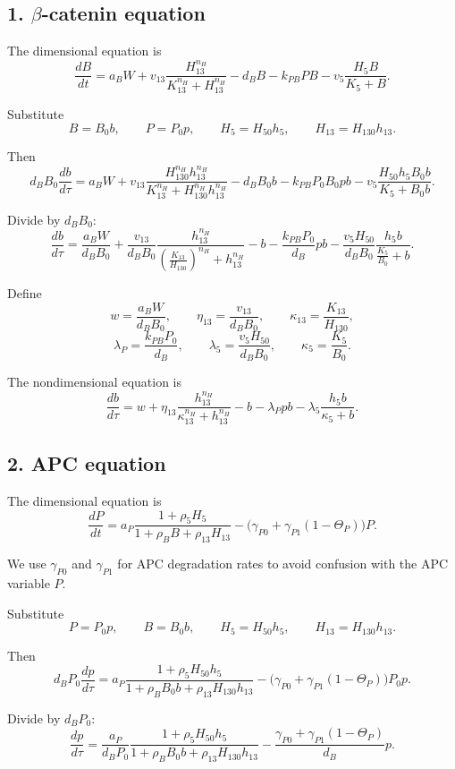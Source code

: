 \documentclass[11pt]{article}
\begin{document}
\subsection{1. \(\beta\)-catenin equation}

The dimensional equation is
\[
\frac{dB}{dt}
=
a_BW
+
v_{13}
\frac{H_{13}^{n_H}}
{K_{13}^{n_H}+H_{13}^{n_H}}
-
d_BB
-
k_{PB}PB
-
v_5\frac{H_5B}{K_5+B}.
\]

Substitute
\[
B=B_0b,\qquad P=P_0p,\qquad H_5=H_{50}h_5,\qquad H_{13}=H_{130}h_{13}.
\]

Then
\[
d_BB_0\frac{db}{d\tau}
=
a_BW
+
v_{13}
\frac{H_{130}^{n_H}h_{13}^{n_H}}
{K_{13}^{n_H}+H_{130}^{n_H}h_{13}^{n_H}}
-
d_BB_0b
-
k_{PB}P_0B_0pb
-
v_5
\frac{H_{50}h_5B_0b}{K_5+B_0b}.
\]

Divide by \(d_BB_0\):
\[
\frac{db}{d\tau}
=
\frac{a_BW}{d_BB_0}
+
\frac{v_{13}}{d_BB_0}
\frac{h_{13}^{n_H}}
{\left(\frac{K_{13}}{H_{130}}\right)^{n_H}+h_{13}^{n_H}}
-
b
-
\frac{k_{PB}P_0}{d_B}pb
-
\frac{v_5H_{50}}{d_BB_0}
\frac{h_5b}{\frac{K_5}{B_0}+b}.
\]

Define
\[
w=\frac{a_BW}{d_BB_0},\qquad
\eta_{13}=\frac{v_{13}}{d_BB_0},\qquad
\kappa_{13}=\frac{K_{13}}{H_{130}},
\]
\[
\lambda_P=\frac{k_{PB}P_0}{d_B},\qquad
\lambda_5=\frac{v_5H_{50}}{d_BB_0},\qquad
\kappa_5=\frac{K_5}{B_0}.
\]

The nondimensional equation is
\[
\boxed{
\frac{db}{d\tau}
=
w
+
\eta_{13}
\frac{h_{13}^{n_H}}
{\kappa_{13}^{n_H}+h_{13}^{n_H}}
-
b
-
\lambda_Ppb
-
\lambda_5\frac{h_5b}{\kappa_5+b}.
}
\]

\subsection{2. APC equation}

The dimensional equation is
\[
\frac{dP}{dt}
=
a_P
\frac{1+\rho_5H_5}
{1+\rho_BB+\rho_{13}H_{13}}
-
\Big(\gamma_{P0}+\gamma_{P1}(1-\Theta_P)\Big)P.
\]

We use \(\gamma_{P0}\) and \(\gamma_{P1}\) for APC degradation rates to avoid confusion with the APC variable \(P\).

Substitute
\[
P=P_0p,\qquad B=B_0b,\qquad H_5=H_{50}h_5,\qquad H_{13}=H_{130}h_{13}.
\]

Then
\[
d_BP_0\frac{dp}{d\tau}
=
a_P
\frac{1+\rho_5H_{50}h_5}
{1+\rho_BB_0b+\rho_{13}H_{130}h_{13}}
-
\Big(\gamma_{P0}+\gamma_{P1}(1-\Theta_P)\Big)P_0p.
\]

Divide by \(d_BP_0\):
\[
\frac{dp}{d\tau}
=
\frac{a_P}{d_BP_0}
\frac{1+\rho_5H_{50}h_5}
{1+\rho_BB_0b+\rho_{13}H_{130}h_{13}}
-
\frac{\gamma_{P0}+\gamma_{P1}(1-\Theta_P)}{d_B}p.
\]
\end{document}
